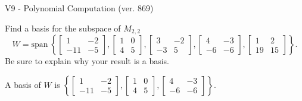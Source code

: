 \begin{exercise}
  \begin{exerciseTitle}V9 - Polynomial Computation (ver. 869)\end{exerciseTitle}
  \begin{exerciseStatement}
    Find a basis for the subspace of \(M_{2,2}\) 
\[W=\mathrm{span}\ \left\{\left[\begin{array}{cc}
1 & -2 \\
-11 & -5
\end{array}\right] , \left[\begin{array}{cc}
1 & 0 \\
4 & 5
\end{array}\right] , \left[\begin{array}{cc}
3 & -2 \\
-3 & 5
\end{array}\right] , \left[\begin{array}{cc}
4 & -3 \\
-6 & -6
\end{array}\right] , \left[\begin{array}{cc}
1 & 2 \\
19 & 15
\end{array}\right]\right\}.\]
 Be sure to explain why your result is a basis.


  \end{exerciseStatement}
  \begin{exerciseAnswer}
   A basis of \(W\) is  \(\left\{\left[\begin{array}{cc}
1 & -2 \\
-11 & -5
\end{array}\right] , \left[\begin{array}{cc}
1 & 0 \\
4 & 5
\end{array}\right] , \left[\begin{array}{cc}
4 & -3 \\
-6 & -6
\end{array}\right]\right\}\).
  


  \end{exerciseAnswer}
\end{exercise}